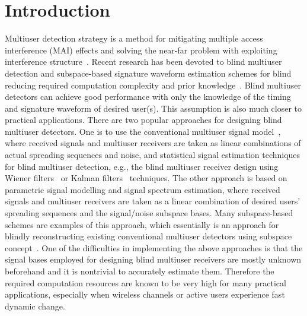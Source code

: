 \documentclass[a4paper,10pt,fleqn, twocolumn]{IEEETran}
\begin{document}
\section{Introduction}
Multiuser detection strategy is a method for mitigating multiple
access interference (MAI) effects and solving the near-far problem
with exploiting interference structure~\cite{Verd98}. Recent
research has been devoted to blind multiuser detection and
subspace-based signature waveform estimation schemes for blind
reducing required computation complexity and prior
knowledge~\cite{Madh94,Honi95,Torl97,Wang98,Wang99,Zhang02}. Blind
multiuser detectors can achieve good performance with only the
knowledge of the timing and signature waveform of desired user(s).
This assumption is also much closer to practical applications.
There are two popular approaches for designing blind multiuser
detectors. One is to use the conventional multiuser signal
model~\cite{Verd98}, where received signals and multiuser
receivers are taken as linear combinations of actual spreading
sequences and noise, and statistical signal estimation techniques
for blind multiuser detection, e.g., the blind multiuser receiver
design using Wiener filters~\cite{Madh94,Honi95} or Kalman
filters~\cite{Zhang02} techniques. The other approach is based on
parametric signal modelling and signal spectrum estimation, where
received signals and multiuser receivers are taken as a linear
combination of desired users' spreading sequences and the
signal/noise subspace bases. Many subspace-based schemes are
examples of this approach, which essentially is an approach for
blindly reconstructing existing conventional multiuser detectors
using subspace concept~\cite{Wang98,Wang99}. One of the
difficulties in implementing the above approaches is that the
signal bases employed for designing blind multiuser receivers are
mostly unknown beforehand and it is nontrivial to accurately
estimate them. Therefore the required computation resources are
known to be very high for many practical applications, especially
when wireless channels or active users experience fast dynamic
change.
\end{document}
